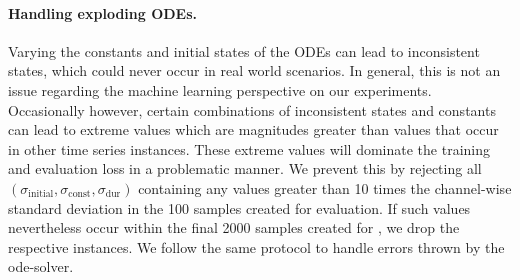 \paragraph{Handling exploding ODEs.}\label{sec:explosions}

Varying the constants and initial states of the ODEs can lead to inconsistent states,
which could never occur in real world scenarios.
In general, this is not an issue regarding the machine learning perspective on our experiments.
Occasionally however, certain combinations of inconsistent states and constants can lead to extreme values which are magnitudes greater than values that occur in other time series instances.
These extreme values will dominate the training and evaluation loss in a problematic manner.
We prevent this by rejecting all $(\sigma_\text{initial},\sigma_\text{const},\sigma_\text{dur})$ containing any values greater than 10 times the channel-wise standard deviation in the 100 samples created for evaluation.
If such values nevertheless occur within the final 2000 samples created for \Bench, we drop the respective instances.
We follow the same protocol to handle errors thrown by the ode-solver.


